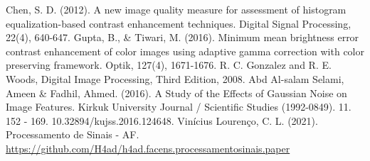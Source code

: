 \documentclass[conference]{IEEEtran}
\begin{document}
\begin{thebibliography}{00}
 Chen, S. D. (2012). A new image quality measure for assessment of histogram equalization-based contrast enhancement techniques. Digital Signal Processing, 22(4), 640-647.
 Gupta, B., \& Tiwari, M. (2016). Minimum mean brightness error contrast enhancement of color images using adaptive gamma correction with color preserving framework. Optik, 127(4), 1671-1676.
 R. C. Gonzalez and R. E. Woods, Digital Image Processing, Third Edition,
2008.
 Abd Al-salam Selami, Ameen \& Fadhil, Ahmed. (2016). A Study of the Effects of Gaussian Noise on Image Features. Kirkuk University Journal / Scientific Studies (1992-0849). 11. 152 - 169. 10.32894/kujss.2016.124648.
 Vinícius Lourenço, C. L. (2021). Processamento de Sinais - AF. \url{https://github.com/H4ad/h4ad.facens.processamentosinais.paper}
\end{thebibliography}
\vspace{12pt}
\end{document}
